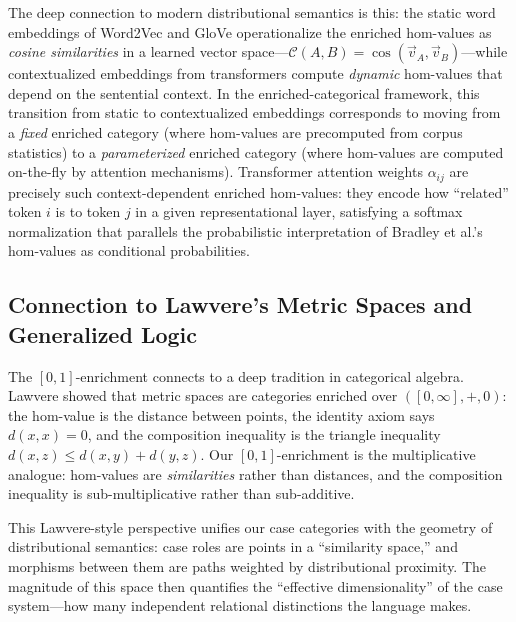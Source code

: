 \documentclass[
]{article}
\numberwithin{equation}{section}
\begin{document}
The deep connection to modern distributional semantics is this: the
static word embeddings of Word2Vec \citep{mikolov2013efficient} and
GloVe \citep{pennington2014glove} operationalize the enriched hom-values
as \emph{cosine similarities} in a learned vector
space---\(\mathcal{C}(A, B) = \cos(\vec{v}_A, \vec{v}_B)\)---while
contextualized embeddings from transformers
\citep{devlin2019bert, vaswani2017attention} compute \emph{dynamic}
hom-values that depend on the sentential context. In the
enriched-categorical framework, this transition from static to
contextualized embeddings corresponds to moving from a \emph{fixed}
enriched category (where hom-values are precomputed from corpus
statistics) to a \emph{parameterized} enriched category (where
hom-values are computed on-the-fly by attention mechanisms). Transformer
attention weights \(\alpha_{ij}\) are precisely such context-dependent
enriched hom-values: they encode how ``related'' token \(i\) is to token
\(j\) in a given representational layer, satisfying a softmax
normalization that parallels the probabilistic interpretation of Bradley
et al.'s \citeyearpar{fritz2021enriched} hom-values as conditional
probabilities.

\subsection{Connection to Lawvere's Metric Spaces and Generalized
Logic}\label{connection-to-lawveres-metric-spaces-and-generalized-logic}

The \([0,1]\)-enrichment connects to a deep tradition in categorical
algebra. Lawvere showed that metric spaces are categories enriched over
\(([0, \infty], +, 0)\): the hom-value is the distance between points,
the identity axiom says \(d(x, x) = 0\), and the composition inequality
is the triangle inequality \(d(x, z) \leq d(x, y) + d(y, z)\). Our
\([0,1]\)-enrichment is the multiplicative analogue: hom-values are
\emph{similarities} rather than distances, and the composition
inequality is sub-multiplicative rather than sub-additive.

This Lawvere-style perspective unifies our case categories with the
geometry of distributional semantics: case roles are points in a
``similarity space,'' and morphisms between them are paths weighted by
distributional proximity. The magnitude of this space then quantifies
the ``effective dimensionality'' of the case system---how many
independent relational distinctions the language makes.

\newpage
\end{document}
